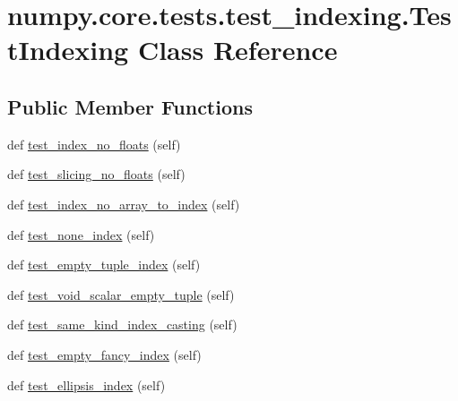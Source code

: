 \hypertarget{classnumpy_1_1core_1_1tests_1_1test__indexing_1_1TestIndexing}{}\section{numpy.\+core.\+tests.\+test\+\_\+indexing.\+Test\+Indexing Class Reference}
\label{classnumpy_1_1core_1_1tests_1_1test__indexing_1_1TestIndexing}
\subsection*{Public Member Functions}
\begin{DoxyCompactItemize}
\item 
def \hyperlink{classnumpy_1_1core_1_1tests_1_1test__indexing_1_1TestIndexing_ae1ad23673c221a6644a6a3cb4f599e1b}{test\+\_\+index\+\_\+no\+\_\+floats} (self)
\item 
def \hyperlink{classnumpy_1_1core_1_1tests_1_1test__indexing_1_1TestIndexing_a43244b853a5603f3269f60ca7629197a}{test\+\_\+slicing\+\_\+no\+\_\+floats} (self)
\item 
def \hyperlink{classnumpy_1_1core_1_1tests_1_1test__indexing_1_1TestIndexing_a28977225e3bf4de893a0bf5e6081da99}{test\+\_\+index\+\_\+no\+\_\+array\+\_\+to\+\_\+index} (self)
\item 
def \hyperlink{classnumpy_1_1core_1_1tests_1_1test__indexing_1_1TestIndexing_abc8cdb071d8902445abd46ae8d8d929e}{test\+\_\+none\+\_\+index} (self)
\item 
def \hyperlink{classnumpy_1_1core_1_1tests_1_1test__indexing_1_1TestIndexing_a2dca9b5fb3a5f3b97ee98a6ef33fef68}{test\+\_\+empty\+\_\+tuple\+\_\+index} (self)
\item 
def \hyperlink{classnumpy_1_1core_1_1tests_1_1test__indexing_1_1TestIndexing_ad01dc01b91c177e5cd6332b4da33b6ce}{test\+\_\+void\+\_\+scalar\+\_\+empty\+\_\+tuple} (self)
\item 
def \hyperlink{classnumpy_1_1core_1_1tests_1_1test__indexing_1_1TestIndexing_a368122414d21730a6074402bf65adc89}{test\+\_\+same\+\_\+kind\+\_\+index\+\_\+casting} (self)
\item 
def \hyperlink{classnumpy_1_1core_1_1tests_1_1test__indexing_1_1TestIndexing_aaa32c9c88993df4211ce08056f90f85b}{test\+\_\+empty\+\_\+fancy\+\_\+index} (self)
\item 
def \hyperlink{classnumpy_1_1core_1_1tests_1_1test__indexing_1_1TestIndexing_a3f9742c08fbbb242557793b3dbd473e2}{test\+\_\+ellipsis\+\_\+index} (self)

\end{DoxyCompactItemize}
